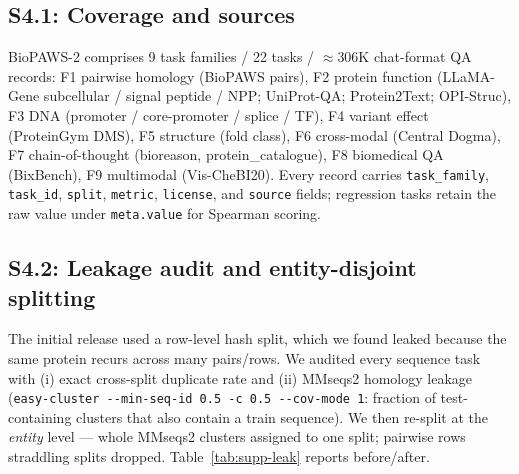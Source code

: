 \documentclass[11pt]{article}
\begin{document}
\subsection*{S4.1: Coverage and sources}
BioPAWS-2 comprises 9 task families / 22 tasks / $\approx$306K chat-format QA records:
F1 pairwise homology (BioPAWS pairs), F2 protein function (LLaMA-Gene subcellular / signal
peptide / NPP; UniProt-QA; Protein2Text; OPI-Struc), F3 DNA (promoter / core-promoter /
splice / TF), F4 variant effect (ProteinGym DMS), F5 structure (fold class), F6 cross-modal
(Central Dogma), F7 chain-of-thought (bioreason, protein\_catalogue), F8 biomedical QA
(BixBench), F9 multimodal (Vis-CheBI20). Every record carries \texttt{task\_family},
\texttt{task\_id}, \texttt{split}, \texttt{metric}, \texttt{license}, and \texttt{source}
fields; regression tasks retain the raw value under \texttt{meta.value} for Spearman scoring.

\subsection*{S4.2: Leakage audit and entity-disjoint splitting}
The initial release used a row-level hash split, which we found leaked because the same
protein recurs across many pairs/rows. We audited every sequence task with (i) exact
cross-split duplicate rate and (ii) MMseqs2 homology leakage (\texttt{easy-cluster
{-}{-}min-seq-id 0.5 -c 0.5 {-}{-}cov-mode 1}: fraction of test-containing clusters that also
contain a train sequence). We then re-split at the \emph{entity} level --- whole MMseqs2
clusters assigned to one split; pairwise rows straddling splits dropped. Table~\ref{tab:supp-leak}
reports before/after.
\end{document}
